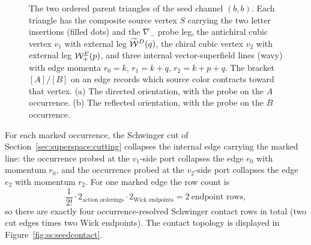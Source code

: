 \begin{figure}[t]
\caption{The two ordered parent triangles of the seed channel $(b,b)$. Each
triangle has the composite source vertex $S$ carrying the two letter
insertions (filled dots) and the $\nabla_{-}$ probe leg, the antichiral cubic
vertex $v_1$ with external leg $\widetilde{\mathcal{W}}^{D}(q)$, the chiral cubic vertex $v_2$
with external leg $\mathcal{W}_{+}^{E}(p)$, and three internal vector-superfield
lines (wavy) with edge momenta $r_0=k$, $r_1=k+q$, $r_2=k+p+q$. The bracket
$[A]$/$[B]$ on an edge records which source color contracts toward that
vertex. (a) The directed orientation, with the probe on the $A$ occurrence.
(b) The reflected orientation, with the probe on the $B$ occurrence.}
\label{fig:ss:seedtriangles}
\end{figure}

For each marked occurrence, the Schwinger cut of
Section~\ref{sec:superspace:cutting} collapses the internal edge carrying the
marked line: the occurrence probed at the $v_1$-side port collapses the edge
$e_0$ with momentum $r_0$, and the occurrence probed at the $v_2$-side port
collapses the edge $e_2$ with momentum $r_2$. For one marked edge the row
count is
\begin{equation}\label{eq:ss:seedcontactcount}
\frac{1}{2!}\cdot 2_{\text{action orderings}}\cdot
2_{\text{Wick endpoints}}=2\ \text{endpoint rows},
\end{equation}
so there are exactly four occurrence-resolved Schwinger contact rows in total
(two cut edges times two Wick endpoints). The contact topology is displayed
in Figure~\ref{fig:ss:seedcontact}.

